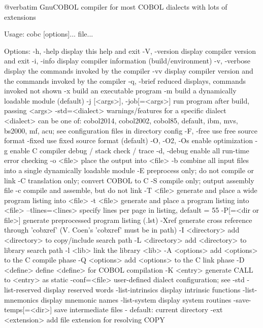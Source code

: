 @verbatim
GnuCOBOL compiler for most COBOL dialects with lots of extensions

Usage: cobc [options]... file...

Options:
  -h, -help             display this help and exit
  -V, -version          display compiler version and exit
  -i, -info             display compiler information (build/environment)
  -v, -verbose          display the commands invoked by the compiler
  -vv                   display compiler version and the commands
                        invoked by the compiler
  -q, -brief            reduced displays, commands invoked not shown
  -x                    build an executable program
  -m                    build a dynamically loadable module (default)
  -j [<args>], -job[=<args>] run program after build, passing <args>
  -std=<dialect>        warnings/features for a specific dialect
                        <dialect> can be one of:
                        cobol2014, cobol2002, cobol85, default,
                        ibm, mvs, bs2000, mf, acu;
                        see configuration files in directory config
  -F, -free             use free source format
  -fixed                use fixed source format (default)
  -O, -O2, -Os          enable optimization
  -g                    enable C compiler debug / stack check / trace
  -d, -debug            enable all run-time error checking
  -o <file>             place the output into <file>
  -b                    combine all input files into a single
                        dynamically loadable module
  -E                    preprocess only; do not compile or link
  -C                    translation only; convert COBOL to C
  -S                    compile only; output assembly file
  -c                    compile and assemble, but do not link
  -T <file>             generate and place a wide program listing into <file>
  -t <file>             generate and place a program listing into <file>
  --tlines=<lines>      specify lines per page in listing, default = 55
  -P[=<dir or file>]    generate preprocessed program listing (.lst)
  -Xref                 generate cross reference through 'cobxref'
                        (V. Coen's 'cobxref' must be in path)
  -I <directory>        add <directory> to copy/include search path
  -L <directory>        add <directory> to library search path
  -l <lib>              link the library <lib>
  -A <options>          add <options> to the C compile phase
  -Q <options>          add <options> to the C link phase
  -D <define>           define <define> for COBOL compilation
  -K <entry>            generate CALL to <entry> as static
  -conf=<file>          user-defined dialect configuration; see -std
  -list-reserved        display reserved words
  -list-intrinsics      display intrinsic functions
  -list-mnemonics       display mnemonic names
  -list-system          display system routines
  -save-temps[=<dir>]   save intermediate files
                        - default: current directory
  -ext <extension>      add file extension for resolving COPY


